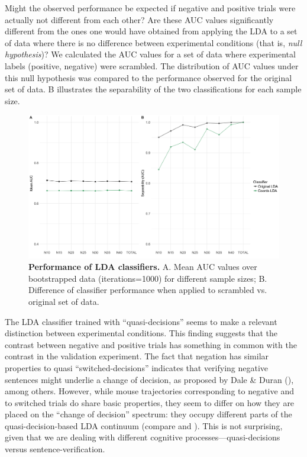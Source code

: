 \documentclass[draft]{article}
\begin{document}
Might the observed performance be expected if negative and positive trials were actually not different from each other? Are these AUC values significantly different from the ones one would have obtained from applying the LDA to a set of data where there is no difference between experimental conditions (that is, \emph{null hypothesis})? We calculated the AUC values for a set of data where experimental labels (positive, negative) were scrambled. The distribution of AUC values under this  null hypothesis was compared to the performance observed for the original set of data. B illustrates the separability of the two classifications for each sample size.

\begin{figure}
\centering
\includegraphics[width=\textwidth]{auc_permutation_negation_1.png}
\caption{\textbf{Performance of LDA classifiers.} A. Mean AUC values over bootstrapped data (iterations=1000) for different sample sizes;  B. Difference of classifier performance when applied to scrambled vs. original set of data.}
\label{fig:permutation_AUC_negation}
\end{figure}

The LDA classifier trained with ``quasi-decisions'' seems to make a relevant distinction between experimental conditions. This finding suggests that the contrast between negative and positive trials has something in common with the contrast in the validation experiment. The fact that negation has similar properties to quasi ``switched-decisions'' indicates that verifying negative sentences might underlie a change of decision, as proposed by Dale \& Duran (\citeyear{Dale2011}), among others.  
However, while mouse trajectories corresponding to negative and to switched trials do share basic properties, they seem to differ on how they are placed on the ``change of decision'' spectrum: they occupy different parts of the quasi-decision-based LDA continuum (compare  and ). This is not surprising, given that we are dealing with different cognitive processes---quasi-decisions versus sentence-verification.
\end{document}
